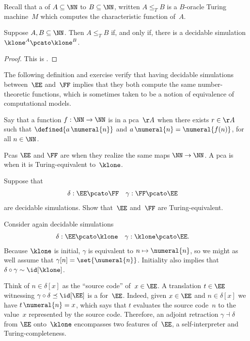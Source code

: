 Recall that a  of $A \subseteq \NN$ to $B \subseteq \NN$, written $A \leq_T B$ is a $B$-oracle Turing machine~$M$ which computes the characteristic function of~$A$.

\begin{theorem}
  Suppose $A, B \subseteq \NN$. Then $A \leq_T B$ if, and only if, there is a decidable simulation $\klone^A \pcato \klone^B$.
\end{theorem}

\begin{proof}
  This is \cite[Proposition 3.1.6]{Longley:95}.
\end{proof}

The following definition and exercise verify that having decidable simulations between~$\EE$ and~$\FF$ implies that they both compute the same number-theoretic functions, which is sometimes taken to be a notion of equivalence of computational models.

\begin{definition}
  Say that a function $f : \NN \to \NN$ is  in a pca~$\AA$ when there exists $r \in \AA$ such that $\defined{a \, \numeral{n}}$ and $a \, \numeral{n} = \numeral{f(n)}$, for all $n \in \NN$.

  Pcas $\EE$ and $\FF$ are  when they realize the same maps $\NN \to \NN$.
  A pca is  when it is Turing-equivalent to~$\klone$.
\end{definition}

\begin{exercise}
  Suppose that
  \begin{align*}
    \delta &: \EE \pcato \FF
    &
      \gamma &: \FF \pcato \EE
  \end{align*}
  are decidable simulations. Show that~$\EE$ and~$\FF$ are Turing-equivalent.
\end{exercise}

Consider again decidable simulations
%
\begin{align*}
  \delta &: \EE \pcato \klone
  &
  \gamma &: \klone \pcato \EE.
\end{align*}
%
Because $\klone$ is initial, $\gamma$ is equivalent to $n \mapsto \numeral{n}$, so we might as well assume that $\gamma[n] = \set{\numeral{n}}$. Initiality also implies that $\delta \circ \gamma \sim \id[\klone]$.

Think of $n \in \delta[x]$ as the ``source code'' of~$x \in \EE$.
%
A translation $t \in \EE$ witnessing $\gamma \circ \delta \preceq \id[\EE]$ is a  for~$\EE$. Indeed, given $x \in \EE$ and $n \in \delta[x]$ we have $t \, \numeral{n} = x$, which says that $t$ evaluates the source code~$n$ to the value~$x$ represented by the source code.
%
Therefore, an adjoint retraction $\gamma \dashv \delta$ from $\EE$ onto~$\klone$ encompasses two features of~$\EE$, a self-interpreter and Turing-completeness.

